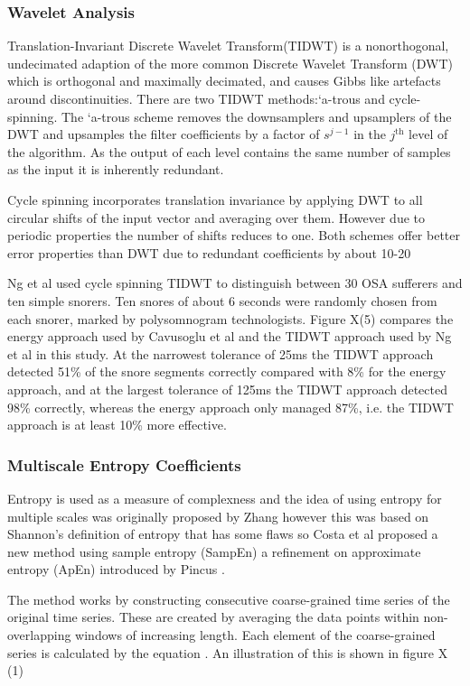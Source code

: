 \subsubsection{Wavelet Analysis}
Translation-Invariant Discrete Wavelet Transform(TIDWT) is a nonorthogonal, undecimated adaption of the more common Discrete Wavelet Transform (DWT) which is orthogonal and maximally decimated, and causes Gibbs like artefacts around discontinuities. There are two TIDWT methods:`a-trous and cycle-spinning. The `a-trous scheme removes the downsamplers and upsamplers of the DWT and upsamples the filter coefficients by a factor of $s^{j-1}$ in the $j^\text{th}$ level of the algorithm. As the output of each level contains the same number of samples as the input it is inherently redundant. 

Cycle spinning incorporates translation invariance by applying DWT to all circular shifts of the input vector and averaging over them. However due to periodic properties the number of shifts reduces to one. Both schemes offer better error properties than DWT due to redundant coefficients by about 10-20%

Ng et al used cycle spinning TIDWT to distinguish between 30 OSA sufferers and ten simple snorers. Ten snores of about 6 seconds were randomly chosen from each snorer, marked by polysomnogram technologists. Figure X(5) compares the energy approach used by Cavusoglu et al and the TIDWT approach used by Ng et al in this study. At the narrowest tolerance of 25ms the TIDWT approach detected 51\% of the snore segments correctly compared with 8\% for the energy approach, and at the largest tolerance of 125ms the TIDWT approach detected 98\% correctly, whereas the energy approach only managed 87\%, i.e. the TIDWT approach is at least 10\% more effective. 

\subsubsection{Multiscale Entropy Coefficients}
Entropy is used as a measure of complexness and the idea of using entropy for multiple scales was originally proposed by Zhang however this was based on Shannon’s definition of entropy that has some flaws so Costa et al proposed a new method using sample entropy (SampEn) a refinement on approximate entropy (ApEn) introduced by Pincus .

The method works by constructing consecutive coarse-grained time series of the original time series. These are created by averaging the data points within non-overlapping windows of increasing length. Each element of the coarse-grained series is calculated by the equation . An illustration of this is shown in figure X (1)


